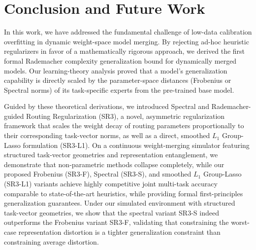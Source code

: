 \section{Conclusion and Future Work}
\label{sec:conclusion}

In this work, we have addressed the fundamental challenge of low-data calibration overfitting in dynamic weight-space model merging. By rejecting ad-hoc heuristic regularizers in favor of a mathematically rigorous approach, we derived the first formal Rademacher complexity generalization bound for dynamically merged models. Our learning-theory analysis proved that a model's generalization capability is directly scaled by the parameter-space distances (Frobenius or Spectral norms) of its task-specific experts from the pre-trained base model.

Guided by these theoretical derivations, we introduced Spectral and Rademacher-guided Routing Regularization (SR3), a novel, asymmetric regularization framework that scales the weight decay of routing parameters proportionally to their corresponding task-vector norms, as well as a direct, smoothed $L_1$ Group-Lasso formulation (SR3-L1). On a continuous weight-merging simulator featuring structured task-vector geometries and representation entanglement, we demonstrate that non-parametric methods collapse completely, while our proposed Frobenius (SR3-F), Spectral (SR3-S), and smoothed $L_1$ Group-Lasso (SR3-L1) variants achieve highly competitive joint multi-task accuracy comparable to state-of-the-art heuristics, while providing formal first-principles generalization guarantees. Under our simulated environment with structured task-vector geometries, we show that the spectral variant SR3-S indeed outperforms the Frobenius variant SR3-F, validating that constraining the worst-case representation distortion is a tighter generalization constraint than constraining average distortion. 

